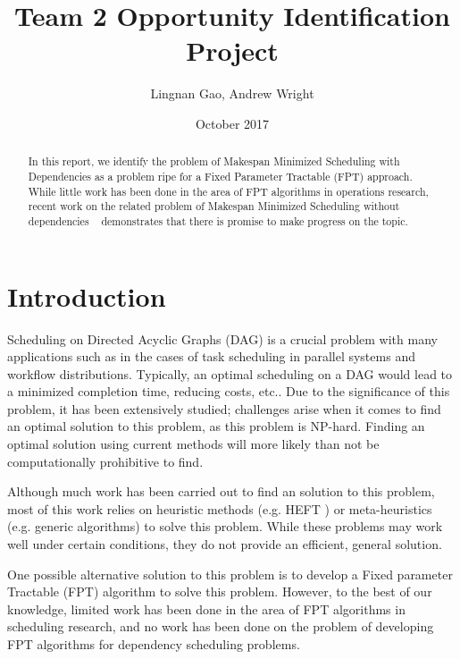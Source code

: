 \documentclass{article}
\title{Team 2 Opportunity Identification Project}
\author{Lingnan Gao, Andrew Wright}
\date{October 2017}
\begin{document}
\maketitle
\begin{abstract}
In this report, we identify the problem of Makespan Minimized Scheduling with
Dependencies as a problem ripe for a Fixed Parameter Tractable (FPT) approach. While little work has been
done in the area of FPT algorithms in operations research, recent work on the
related problem of Makespan Minimized Scheduling without dependencies
~\cite{mnich2015scheduling} demonstrates that there is promise to make progress
on the topic.
\end{abstract}
\newcommand{\defproblem}[4]{%
  \hfill\\\smallskip\noindent%
  \begin{tabularx}{\textwidth}{|l X|}%
    \hline%
    \multicolumn{2}{|l|}{{#1}}\\%
    \textbf{Input:}&#2\\%
    \textbf{Question:}&#4\smallskip\\\hline%
  \end{tabularx}%
  \smallskip%
}%
\section{Introduction}
Scheduling on Directed Acyclic Graphs (DAG) is a crucial problem with many
applications such as in the cases of task scheduling in parallel
systems and workflow distributions. Typically, an optimal scheduling
on a DAG would lead to a minimized completion time,
reducing costs, etc.. Due to the significance of this problem, it has been
extensively studied; challenges arise when it comes to find an optimal solution
to this problem, as this problem is NP-hard. Finding an optimal solution using
current methods will
more likely than not
be computationally prohibitive to find.

Although much work has been carried out to find an solution to this problem, most
of this work relies on heuristic methods (e.g. HEFT \cite{topcuoglu2002performance}) or
meta-heuristics (e.g. generic algorithms) to solve this problem.
While these problems may work well under certain conditions,
they do not provide an efficient, general solution.

One possible alternative solution to this problem is to develop a Fixed
parameter Tractable (FPT)
algorithm to solve this problem. However, to the best of our knowledge,
limited work has been done in the area of FPT algorithms in scheduling
research, and no work has been done on the problem of developing FPT algorithms
for dependency scheduling problems.
\end{document}
